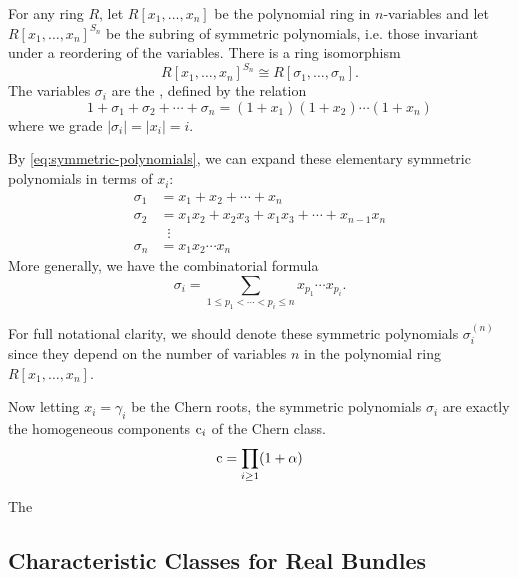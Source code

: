 \begin{theorem}
	For any ring $R$, let $R[x_1,\ldots, x_n]$ be the polynomial ring in $n$-variables and let $R[x_1,\ldots, x_n]^{S_n}$ be the subring of symmetric polynomials, i.e. those invariant under a reordering of the variables. There is a ring isomorphism
	\begin{equation}\label{eq:symmetric-polynomial-isomorphism}
		R[x_1,\ldots, x_n]^{S_n} \cong R[\sigma_1,\ldots, \sigma_n].
	\end{equation}
	The variables $\sigma_i$ are the , defined by the relation
	\begin{equation}\label{eq:symmetric-polynomials}
			1+\sigma_1+\sigma_2+\cdots+\sigma_n = (1+x_1)(1+x_2)\cdots (1+x_n)
	\end{equation}
	where we grade $|\sigma_i|=|x_i|=i$.
\end{theorem}

By \cref{eq:symmetric-polynomials}, we can expand these elementary symmetric polynomials in terms of $x_i$:
\[
	\begin{aligned}
		\sigma_1 &= x_1+x_2+\cdots + x_n\\
		\sigma_2 &= x_1x_2 + x_2x_3 + x_1x_3 +\cdots + x_{n-1}x_n\\
						 &\;\;\vdots\\
		\sigma_n &= x_1x_2\cdots x_n
	\end{aligned}
\]
More generally, we have the combinatorial formula
\[
	\sigma_i = \sum_{1\leq p_1<\cdots <p_i\leq n} x_{p_1}\cdots x_{p_i}.
\]
\begin{remark}
	For full notational clarity, we should denote these symmetric polynomials $\sigma_i^{(n)}$ since they depend on the number of variables $n$ in the polynomial ring $R[x_1,\ldots, x_n]$.
\end{remark}

Now letting $x_i=\gamma_i$ be the Chern roots, the symmetric polynomials $\sigma_i$ are exactly the homogeneous components $\mathrm{c}_i$ of the Chern class. 
\[
	\mathrm{c} = \prod_{i\geq 1} (1+\alpha)
\]

\begin{example}
	The 
\end{example}

\subsection{Characteristic Classes for Real Bundles}

